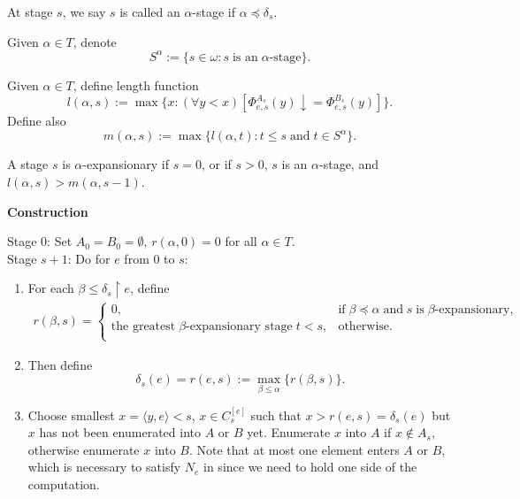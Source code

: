  \begin{definition}
    At stage $s$, we say $s$ is called an $\alpha$-stage if
    $\alpha\preceq\delta_s$.
  \end{definition}

  \begin{definition}
    Given $\alpha\in T$, denote
    \[S^\alpha := \{s\in\omega: s\; \text{is an}\; \alpha\text{-stage}\}.\]
  \end{definition}

  \begin{definition}
    Given $\alpha\in T$, define length function
    \[l(\alpha,s) := \max\{x: (\forall y<x) [\Phi_{e,s}^{A_s}(y)
      \downarrow =\Phi_{e,s}^{B_s}(y)]\}.\]
    Define also
    \[m(\alpha,s) := \max\{l(\alpha,t): t\leq s\; \text{and}\; t\in
    S^{\alpha}\}.\]
  \end{definition}

  \begin{definition}
    A stage $s$ is $\alpha$-expansionary if $s=0$, or if $s>0$, $s$ is an
    $\alpha$-stage, and $l(\alpha,s)>m(\alpha,s-1)$.
  \end{definition}

  \textbf{Construction}
  \begin{tcolorbox}
    Stage 0: Set $A_0=B_0=\emptyset$, $r(\alpha,0)=0$ for all $\alpha\in
    T$. \\

    Stage $s+1$: Do for $e$ from 0 to $s$:
    \begin{enumerate}
      \item For each $\beta\leq \delta_s\restriction e$, define
        \begin{align*}
          r(\beta,s) =
          \begin{cases}
            0, &\text{if}\; \beta\preceq\alpha\; \text{and}\; s\;
              \text{is}\; \beta\text{-expansionary},\\
            \text{the greatest}\; \beta\text{-expansionary stage}\; t<s,
              &\text{otherwise}.\\
          \end{cases}
        \end{align*}
      \item Then define
        \[\delta_s(e) =r(e,s) :=\max_{\beta\leq\alpha}\{r(\beta,s)\}.\]
      \item Choose smallest $x=\langle y,e\rangle<s$, $x\in C_s^{[e]}$ such
        that $x>r(e,s)=\delta_s(e)$ but $x$ has not been enumerated into
        $A$ or $B$ yet. Enumerate $x$ into $A$ if $x\not\in A_s$, otherwise
        enumerate $x$ into $B$. Note that at most one element enters $A$ or
        $B$, which is necessary to satisfy $N_e$ in since we need to hold
        one side of the computation.
    \end{enumerate}
  \end{tcolorbox}

